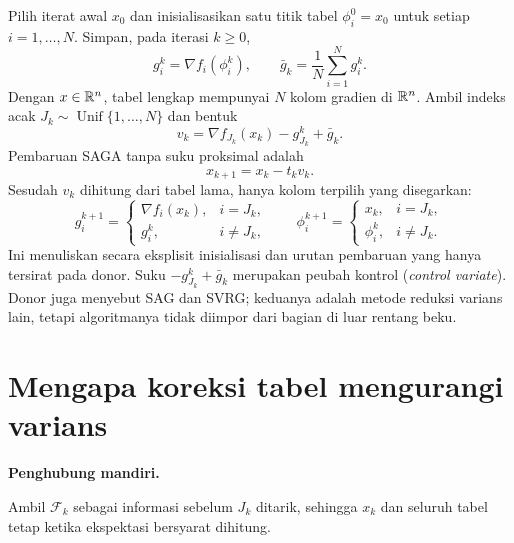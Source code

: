 Pilih iterat awal $x_0$ dan inisialisasikan satu titik tabel
$\phi_i^0=x_0$ untuk setiap $i=1,\dots,N$. Simpan, pada iterasi $k\geq0$,
\begin{equation}
  g_i^k=\nabla f_i(\phi_i^k),
  \qquad
  \bar g_k=\frac{1}{N}\sum_{i=1}^{N}g_i^k.
\end{equation}
Dengan $x\in\mathbb{R}^n$, tabel lengkap mempunyai $N$ kolom gradien di $\mathbb{R}^n$.
Ambil indeks acak
$J_k\sim\operatorname{Unif}\{1,\dots,N\}$ dan bentuk
\begin{equation}
  \label{becker03:eq:saga-estimator}
  v_k
  =\nabla f_{J_k}(x_k)-g_{J_k}^k+\bar g_k.
\end{equation}
Pembaruan SAGA tanpa suku proksimal adalah
\begin{equation}
  \label{becker03:eq:saga-update}
  x_{k+1}=x_k-t_kv_k.
\end{equation}
Sesudah $v_k$ dihitung dari tabel lama, hanya kolom terpilih yang disegarkan:
\begin{equation}
  \label{becker03:eq:table-update}
  g_i^{k+1}=
  \begin{cases}
    \nabla f_i(x_k),&i=J_k,\\
    g_i^k,&i\ne J_k,
  \end{cases}
  \qquad
  \phi_i^{k+1}=
  \begin{cases}
    x_k,&i=J_k,\\
    \phi_i^k,&i\ne J_k.
  \end{cases}
\end{equation}
Ini menuliskan secara eksplisit inisialisasi dan urutan pembaruan yang hanya
tersirat pada donor. Suku
$-g_{J_k}^k+\bar g_k$ merupakan peubah kontrol
(\emph{control variate}). Donor juga menyebut SAG dan SVRG; keduanya adalah
metode reduksi varians lain, tetapi algoritmanya tidak diimpor dari bagian di
luar rentang beku.

\section{Mengapa koreksi tabel mengurangi varians}
\label{becker03:section:variance-identity}

\noindent\textbf{Penghubung mandiri.}\par
Ambil $\mathcal F_k$ sebagai informasi sebelum $J_k$ ditarik, sehingga
$x_k$ dan seluruh tabel tetap ketika ekspektasi bersyarat dihitung.

